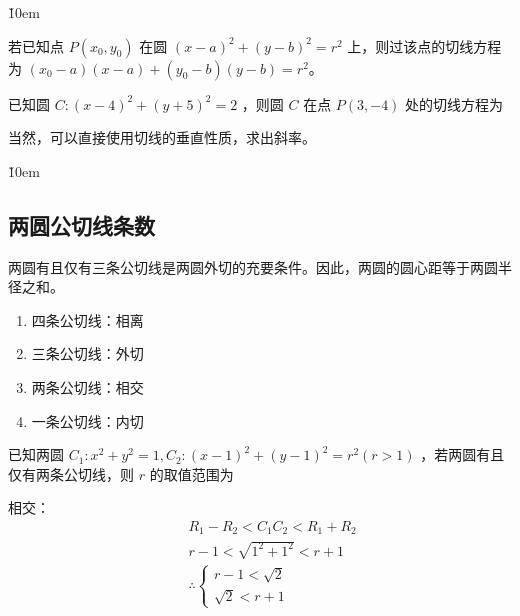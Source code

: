 \v{10em}

\begin{theorem}[过圆上一点的切线方程]
    若已知点 $P(x_0, y_0)$ 在圆 $(x-a)^2+(y-b)^2=r^2$ 上，则过该点的切线方程为 $(x_0-a)(x-a)+(y_0-b)(y-b)=r^2$。
\end{theorem}

\begin{example}
    已知圆 $C:(x-4)^2+(y+5)^2=2$ ，则圆 $C$ 在点 $P(3,-4)$ 处的切线方程为 \underline{\qquad}
\end{example}

\begin{tips}
    当然，可以直接使用切线的垂直性质，求出斜率。
\end{tips}

\v{10em}

\subsection{两圆公切线条数}

\begin{theorem}[两圆公切线条数]
    两圆有且仅有三条公切线是两圆外切的充要条件。因此，两圆的圆心距等于两圆半径之和。
    \begin{enumerate}
        \item 四条公切线：相离
        \item 三条公切线：外切
        \item 两条公切线：相交
        \item 一条公切线：内切
    \end{enumerate}
\end{theorem}

\begin{example}
    已知两圆 $C_1: x^2+y^2=1, C_2:(x-1)^2+(y-1)^2=r^2(r>1)$ ，若两圆有且仅有两条公切线，则 $r$ 的取值范围为
\end{example}

\begin{solution}
    相交：
    $$
        \begin{aligned}
            \quad & R_1-R_2<C_1 C_2<R_1+R_2              \\
                  & r-1<\sqrt{1^2+1^2}<r+1               \\
                  & \therefore \left\{\begin{array}{l}
                                          r-1<\sqrt{2} \\
                                          \sqrt{2}<r+1
                                      \end{array}\right.
        \end{aligned}
    $$
\end{solution}

